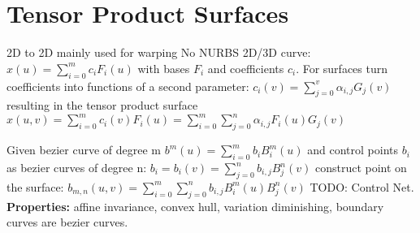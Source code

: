 \section{Tensor Product Surfaces}
2D to 2D mainly used for warping
No NURBS
 2D/3D curve: $x(u) = \sum_{i=0}^mc_iF_i(u)$ with bases $F_i$ and coefficients $c_i$. For surfaces turn coefficients into functions of a second parameter: $c_i(v) = \sum_{j=0}^v\alpha_{i,j}G_j(v)$ resulting in the tensor product surface $x(u,v) = \sum_{i=0}^mc_i(v)F_i(u) = \sum_{i=0}^m\sum_{j=0}^n\alpha_{i,j}F_i(u)G_j(v)$

 Given bezier curve of degree m $b^m(u) = \sum_{i=0}^mb_iB_i^m(u)$ and control points $b_i$ as bezier curves of degree n: $b_i = b_i(v) = \sum_{j=0}^nb_{i,j}B_j^n(v)$ construct point on the surface: $b_{m,n}(u,v) = \sum_{i=0}^m\sum_{j=0}^nb_{i,j}B_i^m(u)B_j^n(v)$ TODO: Control Net. \\
\textbf{Properties:} affine invariance, convex hull, variation diminishing, boundary curves are bezier curves.

%
%
%
%
%
